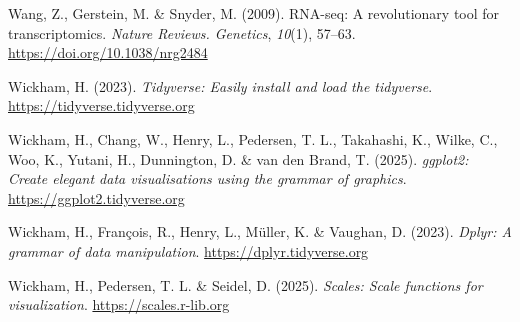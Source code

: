 \documentclass[
  letterpaper,
  DIV=11,
  numbers=noendperiod]{scrartcl}
\newlength{\cslhangindent}
\newenvironment{CSLReferences}[2] %
 {\begin{list}{}{%
  \setlength{\itemindent}{0pt}
  \setlength{\leftmargin}{0pt}
  \setlength{\parsep}{0pt}
  \ifodd #1
   \setlength{\leftmargin}{\cslhangindent}
   \setlength{\itemindent}{-1\cslhangindent}
  \fi
  \setlength{\itemsep}{#2\baselineskip}}}
 {\end{list}}
\begin{document}
\begin{CSLReferences}{1}{0}
Wang, Z., Gerstein, M. \& Snyder, M. (2009). RNA-seq: A revolutionary
tool for transcriptomics. \emph{Nature Reviews. Genetics}, \emph{10}(1),
57--63. \url{https://doi.org/10.1038/nrg2484}

Wickham, H. (2023). \emph{Tidyverse: Easily install and load the
tidyverse}. \url{https://tidyverse.tidyverse.org}

Wickham, H., Chang, W., Henry, L., Pedersen, T. L., Takahashi, K.,
Wilke, C., Woo, K., Yutani, H., Dunnington, D. \& van den Brand, T.
(2025). \emph{ggplot2: Create elegant data visualisations using the
grammar of graphics}. \url{https://ggplot2.tidyverse.org}

Wickham, H., François, R., Henry, L., Müller, K. \& Vaughan, D. (2023).
\emph{Dplyr: A grammar of data manipulation}.
\url{https://dplyr.tidyverse.org}

Wickham, H., Pedersen, T. L. \& Seidel, D. (2025). \emph{Scales: Scale
functions for visualization}. \url{https://scales.r-lib.org}

\end{CSLReferences}
\end{document}
